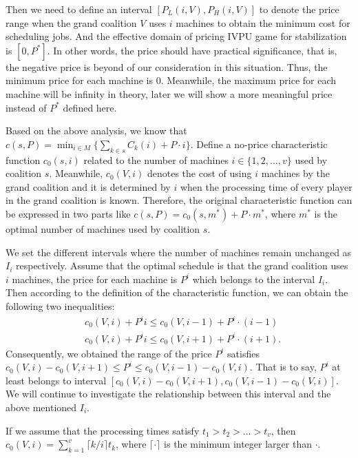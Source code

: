 Then we need to define an interval $[P_L(i,V),P_H(i,V)]$ to denote the price range when the grand coalition $V$ uses $i$ machines to obtain the minimum cost for scheduling jobs. And the effective domain of pricing IVPU game for stabilization is $[0,P^*]$.
In other words, the price should have practical significance, that is, the negative price is beyond of our consideration in this situation. Thus, the minimum price for each machine is 0. Meanwhile, the maximum price for each machine will be infinity in theory, later we will show a more meaningful price instead of $P^*$ defined here.

Based on the above analysis, we know that $c(s,P) = \min_{i \in M} \{\sum_{k\in s}{C_k(i)}+ P\cdot i\}.$ Define a no-price characteristic function $c_0(s,i)$
related to the number of machines $i \in \{1,2,\ldots,v\}$ used by coalition $s.$ Meanwhile, $c_0(V,i)$ denotes the cost of using $i$ machines by the grand coalition and it is determined by $i$ when the processing time of every player in the grand coalition is known.
Therefore, the original characteristic function can be expressed in two parts like $c(s,P) = c_0(s,m^*) + P\cdot m^*$, where $m^*$ is the optimal number of machines used by coalition $s$.

We set the different intervals where the number of machines remain unchanged as $I_i$ respectively.
Assume that the optimal schedule is that the grand coalition uses $i$ machines, the price for each machine is $P^i$ which belongs to the interval $I_i$.
Then according to the definition of the characteristic function, we can obtain the following two inequalities:
\[
\begin{aligned}
&c_0 (V,i) + P^i i \leq c_0 (V,i-1) + P^i\cdot(i-1) \\
&c_0 (V,i) + P^i i \leq c_0 (V,i+1) + P^i\cdot(i+1).
\end{aligned}
\]
Consequently, we obtained the range of the price $P^i$ satisfies $c_0 (V,i) - c_0 (V,i+1) \leq P^i \leq c_0 (V,i-1) - c_0 (V,i)$.
That is to say, $P^i$ at least belongs to interval $[c_0 (V,i) - c_0 (V,i+1), c_0 (V,i-1) - c_0 (V,i)].$
We will continue to investigate the relationship between this interval and the above mentioned $I_i$.


If we assume that the processing times satisfy $t_1 > t_2 > \ldots > t_v$, then $c_0(V,i) = \sum_{k=1}^{v} {\lceil k/i \rceil} t_{k}$, where $\lceil \cdot \rceil$ is the minimum integer larger than $\cdot$.

